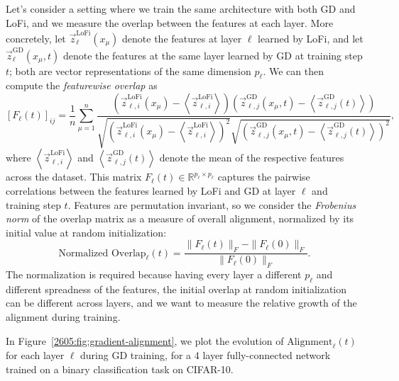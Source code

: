 Let's consider a setting where we train the same architecture with both GD and LoFi, and we measure the overlap between the features at each layer. More concretely, let \(\vec{z}_{\ell}^{\text{LoFi}}(x_\mu)\) denote the features at layer \(\ell\) learned by LoFi, and let \(\vec{z}_{\ell}^{\text{GD}}(x_\mu, t)\) denote the features at the same layer learned by GD at training step \(t\); both are vector representations of the same dimension \(p_\ell\). We can then compute the \emph{featurewise overlap} as
\begin{equation}
    \left[F_{\ell}(t)\right]_{ij} = \frac{1}{n} \sum_{\mu=1}^n \frac{\left(\vec{z}_{\ell,i}^{\text{LoFi}}(x_\mu) - \left\langle\vec{z}_{\ell,i}^{\text{LoFi}}\right\rangle\right) \left(\vec{z}_{\ell,j}^{\text{GD}}(x_\mu, t) - \left\langle\vec{z}_{\ell,j}^{\text{GD}}(t)\right\rangle\right)}{\sqrt{\left(\vec{z}_{\ell,i}^{\text{LoFi}}(x_\mu) - \left\langle\vec{z}_{\ell,i}^{\text{LoFi}}\right\rangle\right)^2} \sqrt{\left(\vec{z}_{\ell,j}^{\text{GD}}(x_\mu, t) - \left\langle\vec{z}_{\ell,j}^{\text{GD}}(t)\right\rangle\right)^2}},
\end{equation}
where \(\left\langle\vec{z}_{\ell,i}^{\text{LoFi}}\right\rangle\) and \(\left\langle\vec{z}_{\ell,j}^{\text{GD}}(t)\right\rangle\) denote the mean of the respective features across the dataset. This matrix \(F_{\ell}(t)\in \mathbb{R}^{p_\ell \times p_\ell}\) captures the pairwise correlations between the features learned by LoFi and GD at layer \(\ell\) and training step \(t\). Features are permutation invariant, so we consider the \emph{Frobenius norm} of the overlap matrix as a measure of overall alignment, normalized by its initial value at random initialization:
\begin{equation}
    \text{Normalized Overlap}_{\ell}(t) = \frac{\|F_{\ell}(t)\|_F- \|F_{\ell}(0)\|_F}{\|F_{\ell}(0)\|_F}.
\end{equation}
The normalization is required because having every layer a different \(p_\ell\) and different spreadness of the features, the initial overlap at random initialization can be different across layers, and we want to measure the relative growth of the alignment during training.

In Figure~\ref{2605:fig:gradient-alignment}, we plot the evolution of \(\text{Alignment}_{\ell}(t)\) for each layer \(\ell\) during GD training, for a 4 layer fully-connected network trained on a binary classification task on CIFAR-10. 


